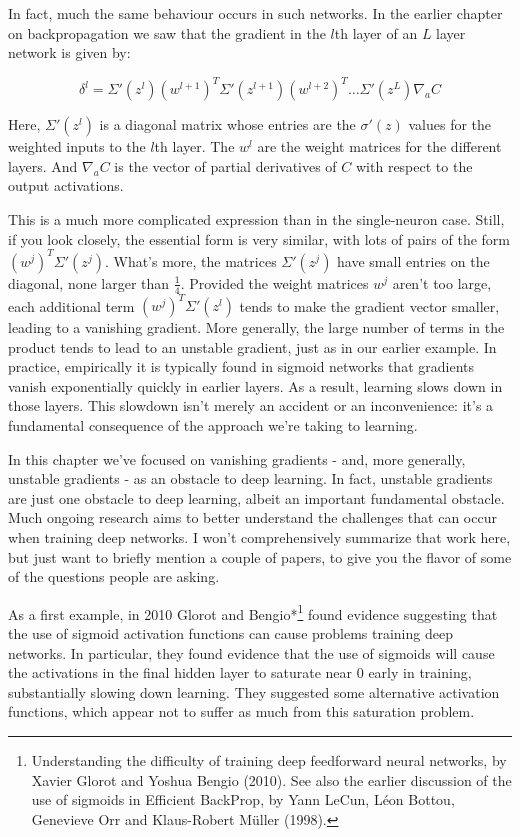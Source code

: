 In fact, much the same behaviour occurs in such networks. In the earlier chapter on backpropagation we saw that the gradient in the $l$th layer of an $L$ layer network is given by:

\begin{equation}
\delta^l = \Sigma'(z^l) (w^{l+1})^T \Sigma'(z^{l+1}) (w^{l+2})^T \ldots \Sigma'(z^L) \nabla_a C
\tag{124}
\end{equation}

\noindent Here, $\Sigma'(z^l)$ is a diagonal matrix whose entries are the $\sigma'(z)$ values for the weighted inputs to the $l$th layer. The $w^l$ are the weight matrices for the different layers. And $\nabla_a C$ is the vector of partial derivatives of $C$ with respect to the output activations.


This is a much more complicated expression than in the single-neuron case. Still, if you look closely, the essential form is very similar, with lots of pairs of the form $(w^j)^T \Sigma'(z^j)$. What's more, the matrices $\Sigma'(z^j)$ have small entries on the diagonal, none larger than $\frac{1}{4}$. Provided the weight matrices $w^j$ aren't too large, each additional term $(w^j)^T \Sigma'(z^l)$ tends to make the gradient vector smaller, leading to a vanishing gradient. More generally, the large number of terms in the product tends to lead to an unstable gradient, just as in our earlier example. In practice, empirically it is typically found in sigmoid networks that gradients vanish exponentially quickly in earlier layers. As a result, learning slows down in those layers. This slowdown isn't merely an accident or an inconvenience: it's a fundamental consequence of the approach we're taking to learning.





In this chapter we've focused on vanishing gradients - and, more generally, unstable gradients - as an obstacle to deep learning. In fact, unstable gradients are just one obstacle to deep learning, albeit an important fundamental obstacle. Much ongoing research aims to better understand the challenges that can occur when training deep networks. I won't comprehensively summarize that work here, but just want to briefly mention a couple of papers, to give you the flavor of some of the questions people are asking.


As a first example, in 2010 Glorot and Bengio*\footnote{Understanding the difficulty of training deep feedforward neural networks, by Xavier Glorot and Yoshua Bengio (2010). See also the earlier discussion of the use of sigmoids in Efficient BackProp, by Yann LeCun, Léon Bottou, Genevieve Orr and Klaus-Robert Müller (1998).} found evidence suggesting that the use of sigmoid activation functions can cause problems training deep networks. In particular, they found evidence that the use of sigmoids will cause the activations in the final hidden layer to saturate near $0$ early in training, substantially slowing down learning. They suggested some alternative activation functions, which appear not to suffer as much from this saturation problem.


